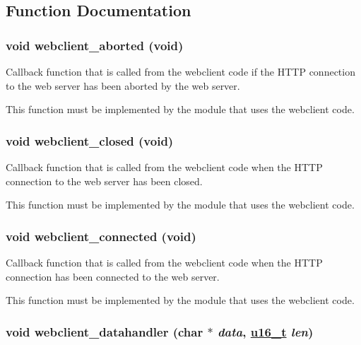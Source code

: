 \subsection{Function Documentation}
\hypertarget{a00079_gf11d9915ec12a8cdd9fdcbb5e8fcd5c7}{
\subsubsection[webclient\_\-aborted]{\setlength{\rightskip}{0pt plus 5cm}void webclient\_\-aborted (void)}}
\label{a00079_gf11d9915ec12a8cdd9fdcbb5e8fcd5c7}


Callback function that is called from the webclient code if the HTTP connection to the web server has been aborted by the web server. 

This function must be implemented by the module that uses the webclient code. \hypertarget{a00079_gf8f12c820cc08da32aa62898bfc02db3}{
\subsubsection[webclient\_\-closed]{\setlength{\rightskip}{0pt plus 5cm}void webclient\_\-closed (void)}}
\label{a00079_gf8f12c820cc08da32aa62898bfc02db3}


Callback function that is called from the webclient code when the HTTP connection to the web server has been closed. 

This function must be implemented by the module that uses the webclient code. \hypertarget{a00079_g6b942c1ef22f8cd1a726ef3364c9fbea}{
\subsubsection[webclient\_\-connected]{\setlength{\rightskip}{0pt plus 5cm}void webclient\_\-connected (void)}}
\label{a00079_g6b942c1ef22f8cd1a726ef3364c9fbea}


Callback function that is called from the webclient code when the HTTP connection has been connected to the web server. 

This function must be implemented by the module that uses the webclient code. \hypertarget{a00079_gc4b119801e50cc1824498a1cdf9adc37}{
\subsubsection[webclient\_\-datahandler]{\setlength{\rightskip}{0pt plus 5cm}void webclient\_\-datahandler (char $\ast$ {\em data}, \hyperlink{a00070_gfc6499c1f28697aa3bfc2804d496fd11}{u16\_\-t} {\em len})}}
\label{a00079_gc4b119801e50cc1824498a1cdf9adc37}


